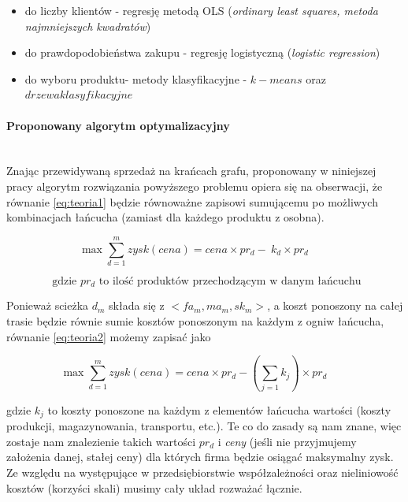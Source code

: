 \documentclass{article}
\begin{document}
	\begin{itemize} 
		\item do liczby klientów - regresję metodą OLS (\textit{ordinary least squares, metoda najmniejszych kwadratów})
		\item do prawdopodobieństwa zakupu - regresję logistyczną (\textit{logistic regression})
		\item do wyboru produktu- metody klasyfikacyjne - $k-means$ oraz $drzewa klasyfikacyjne$
	\end{itemize}

\newpage

\paragraph{Proponowany algorytm optymalizacyjny} \mbox{}\\
Znając przewidywaną sprzedaż na krańcach grafu, proponowany w niniejszej pracy algorytm rozwiązania powyższego problemu opiera się na obserwacji, że równanie \ref{eq:teoria1} będzie równoważne zapisowi sumującemu po możliwych kombinacjach łańcucha (zamiast dla każdego produktu z osobna).

\begin{equation}  \label{eq:teoria2}
\max \sum\limits_{d=1}^m  zysk(cena) = 
cena \times pr_d -  \ k_d \times pr_d \qquad 
\end{equation}

\begin{equation*}
  \text{ gdzie $pr_d$ to ilość produktów przechodzącym w danym łańcuchu}
\end{equation*}

Ponieważ scieżka $d_m$ składa się z $<fa_m,ma_m,sk_m>$, a koszt ponoszony na całej trasie będzie równie sumie kosztów ponoszonym na każdym z ogniw łańcucha, równanie \ref{eq:teoria2} możemy zapisać jako

\begin{equation} \label{eq:teoria3}
\max \sum\limits_{d=1}^m  zysk(cena) = 
cena \times pr_d -  ( \sum\limits_{j=1} k_j) \times pr_d \qquad 
\end{equation}


gdzie $ k_j$ to koszty ponoszone na każdym z elementów łańcucha wartości (koszty produkcji, magazynowania, transportu, etc.). Te co do zasady są nam znane, więc zostaje nam znalezienie takich wartości $pr_d$ i \textit{ceny} (jeśli nie przyjmujemy założenia danej, stałej ceny) dla których firma będzie osiągać maksymalny zysk. Ze względu na występujące w przedsiębiorstwie współzależności oraz nieliniowość kosztów (korzyści skali) musimy cały układ rozważać łącznie. 
\end{document}
